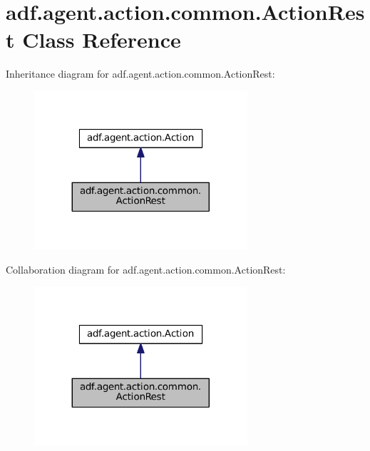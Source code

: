 \hypertarget{classadf_1_1agent_1_1action_1_1common_1_1ActionRest}{}\section{adf.\+agent.\+action.\+common.\+Action\+Rest Class Reference}
\label{classadf_1_1agent_1_1action_1_1common_1_1ActionRest}


Inheritance diagram for adf.\+agent.\+action.\+common.\+Action\+Rest\+:
\nopagebreak
\begin{figure}[H]
\begin{center}
\leavevmode
\includegraphics[width=224pt]{classadf_1_1agent_1_1action_1_1common_1_1ActionRest__inherit__graph}
\end{center}
\end{figure}


Collaboration diagram for adf.\+agent.\+action.\+common.\+Action\+Rest\+:
\nopagebreak
\begin{figure}[H]
\begin{center}
\leavevmode
\includegraphics[width=224pt]{classadf_1_1agent_1_1action_1_1common_1_1ActionRest__coll__graph}
\end{center}
\end{figure}
